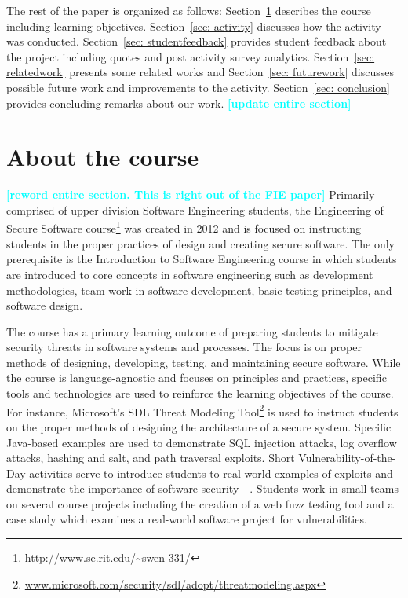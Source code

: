 \documentclass[conference]{IEEEtran}
\newcommand{\todo}[1]{\textcolor{cyan}{\textbf{[#1]}}}
\begin{document}


The rest of the paper is organized as follows: Section~\ref{sec: aboutcourse} describes the course including learning objectives. Section~\ref{sec: activity} discusses how the activity was conducted. Section~\ref{sec: studentfeedback} provides student feedback about the project including quotes and post activity survey analytics. Section~\ref{sec: relatedwork} presents some related works and Section~\ref{sec: futurework} discusses possible future work and improvements to the activity. Section~\ref{sec: conclusion} provides concluding remarks about our work. \todo{update entire section}



\section{About the course}
\label{sec: aboutcourse}

\todo{reword entire section. This is right out of the FIE paper}
Primarily comprised of upper division Software Engineering students, the Engineering of Secure Software
course\footnote{\url{http://www.se.rit.edu/~swen-331/}} was created in 2012 and is focused on instructing students in the proper practices of design and creating secure software. The only prerequisite is the Introduction to Software Engineering course in which students are introduced to core concepts in software engineering such as development methodologies, team work in software development, basic testing principles, and software design.

The course has a primary learning outcome of preparing students to mitigate security threats in software systems and processes. The focus is on proper methods of designing, developing, testing, and maintaining secure software. While the course is language-agnostic and focuses on principles and practices, specific tools and technologies are used to reinforce the learning objectives of the course. For instance, Microsoft's SDL Threat Modeling Tool\footnote{\url{www.microsoft.com/security/sdl/adopt/threatmodeling.aspx}} is used to instruct students on the proper methods of designing the architecture of a secure system. Specific Java-based examples are used to demonstrate SQL injection attacks, log overflow attacks, hashing and salt, and path traversal exploits. Short Vulnerability-of-the-Day activities serve to introduce students to real world examples of exploits and demonstrate the importance of software security~\ \cite{MeneelyICSESEE2013}. Students work in small teams on several course projects including the creation of a web fuzz testing tool and a case study which examines a real-world software project for vulnerabilities.
\end{document}

